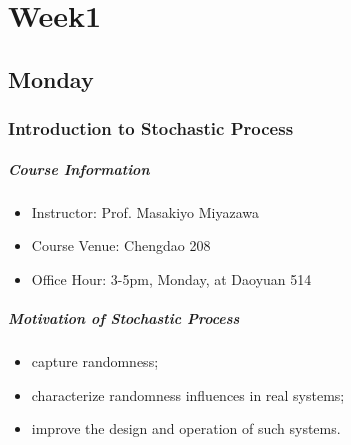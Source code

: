 
\chapter{Week1}

\section{Monday}

\subsection{Introduction to Stochastic Process}
\paragraph{Course Information}
\begin{itemize}
\item
Instructor: Prof. Masakiyo Miyazawa
\item
Course Venue: Chengdao 208
\item
Office Hour: 3-5pm, Monday, at Daoyuan 514
\end{itemize}
\paragraph{Motivation of Stochastic Process}
\begin{itemize}
\item
capture randomness;
\item
characterize randomness influences in real systems;
\item
improve the design and operation of such systems.
\end{itemize}

